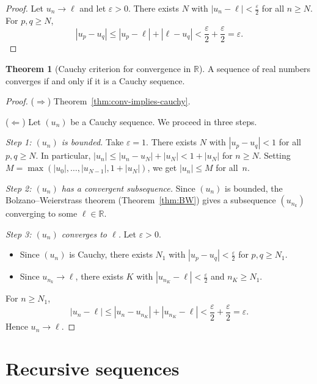 \documentclass[12pt,a4paper,openany]{book}
\newcommand{\R}{\mathbb{R}}
\newcommand{\eps}{\varepsilon}
\newcommand{\abs}[1]{\left\lvert #1 \right\rvert}
\theoremstyle{definition}
\newtheorem{theorem}{Theorem}[chapter]
\theoremstyle{remark}
\begin{document}
\begin{proof}
Let $u_n \to \ell$ and let $\eps > 0$. There exists $N$ with
$\abs{u_n - \ell} < \frac{\eps}{2}$ for all $n \geq N$.
For $p, q \geq N$,
\[
   \abs{u_p - u_q}
   \leq \abs{u_p - \ell} + \abs{\ell - u_q}
   < \frac{\eps}{2} + \frac{\eps}{2} = \eps.
\]
\end{proof}

\begin{theorem}[Cauchy criterion for convergence in $\R$]
\label{thm:cauchy-criterion}
A sequence of real numbers converges if and only if it is a Cauchy sequence.
\end{theorem}

\begin{proof}
($\Rightarrow$) Theorem~\ref{thm:conv-implies-cauchy}.

($\Leftarrow$) Let $(u_n)$ be a Cauchy sequence. We proceed in three steps.

\medskip
\textit{Step 1: $(u_n)$ is bounded.}
Take $\eps = 1$. There exists $N$ with $\abs{u_p - u_q} < 1$ for all
$p, q \geq N$. In particular, $\abs{u_n} \leq \abs{u_n - u_N} + \abs{u_N}
< 1 + \abs{u_N}$ for $n \geq N$. Setting
$M = \max(\abs{u_0}, \ldots, \abs{u_{N-1}}, 1 + \abs{u_N})$,
we get $\abs{u_n} \leq M$ for all~$n$.

\medskip
\textit{Step 2: $(u_n)$ has a convergent subsequence.}
Since $(u_n)$ is bounded, the Bolzano--Weierstrass theorem
(Theorem~\ref{thm:BW}) gives a subsequence $(u_{n_k})$ converging to some
$\ell \in \R$.

\medskip
\textit{Step 3: $(u_n)$ converges to $\ell$.}
Let $\eps > 0$.
\begin{itemize}
\item Since $(u_n)$ is Cauchy, there exists $N_1$ with
      $\abs{u_p - u_q} < \frac{\eps}{2}$ for $p, q \geq N_1$.
\item Since $u_{n_k} \to \ell$, there exists $K$ with
      $\abs{u_{n_K} - \ell} < \frac{\eps}{2}$ and $n_K \geq N_1$.
\end{itemize}
For $n \geq N_1$,
\[
   \abs{u_n - \ell}
   \leq \abs{u_n - u_{n_K}} + \abs{u_{n_K} - \ell}
   < \frac{\eps}{2} + \frac{\eps}{2} = \eps.
\]
Hence $u_n \to \ell$.
\end{proof}

\section{Recursive sequences}\label{sec:recursive-seq}
\end{document}
